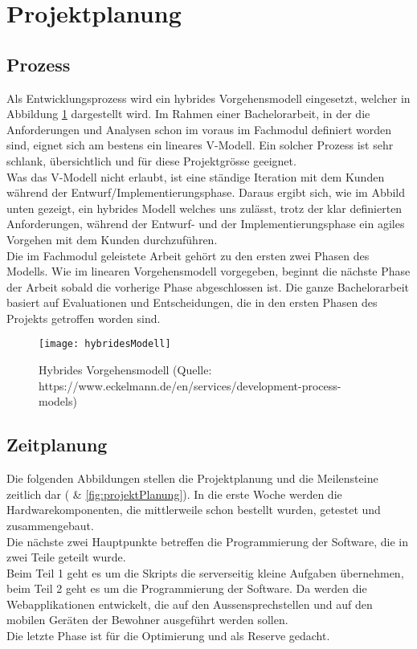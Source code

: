 \section{Projektplanung}
\label{sec:chapterexample}

\subsection{Prozess}
\label{sec:chapterexample}
Als Entwicklungsprozess wird ein hybrides Vorgehensmodell eingesetzt, welcher in Abbildung \ref{fig:hybridesModell} dargestellt wird. Im Rahmen einer Bachelorarbeit, in der die Anforderungen und Analysen schon im voraus im Fachmodul definiert worden sind, eignet sich am bestens ein lineares V-Modell. Ein solcher Prozess ist sehr schlank, übersichtlich und für diese Projektgrösse geeignet.
\\
Was das V-Modell nicht erlaubt, ist eine ständige Iteration mit dem Kunden während der Entwurf/Implementierungsphase. Daraus ergibt sich, wie im Abbild unten gezeigt, ein hybrides Modell welches uns zulässt, trotz der klar definierten Anforderungen, während der Entwurf- und der Implementierungsphase ein agiles Vorgehen mit dem Kunden durchzuführen.
\\
Die im Fachmodul geleistete Arbeit gehört zu den ersten zwei Phasen des Modells. Wie im linearen Vorgehensmodell vorgegeben, beginnt die nächste Phase der Arbeit sobald die vorherige Phase abgeschlossen ist. Die ganze Bachelorarbeit basiert auf Evaluationen und Entscheidungen, die in den ersten Phasen des Projekts getroffen worden sind. 

\begin{figure}[htb!]
	\begin{center}
		\texttt{[image: hybridesModell]}
		\caption[Hybrides Vorgehensmodell]{Hybrides Vorgehensmodell (Quelle: https://www.eckelmann.de/en/services/development-process-models)}
		\label{fig:hybridesModell}
	\end{center}
\end{figure}


\subsection{Zeitplanung}
\label{sec:zeitplanung}
Die folgenden Abbildungen stellen die Projektplanung und die Meilensteine zeitlich dar ( \& \cref{fig:projektPlanung}). In die erste Woche werden die Hardwarekomponenten, die mittlerweile schon bestellt wurden, getestet und zusammengebaut. 
\\
Die nächste zwei Hauptpunkte betreffen die Programmierung der  Software, die in zwei Teile geteilt wurde.
\\ 
Beim Teil 1 geht es um die Skripts die serverseitig kleine Aufgaben übernehmen, beim Teil 2 geht es um die Programmierung der Software. Da werden die Webapplikationen entwickelt, die auf den Aussensprechstellen und auf den mobilen Geräten der Bewohner ausgeführt werden sollen.
\\
Die letzte Phase ist für die Optimierung und als Reserve gedacht.

